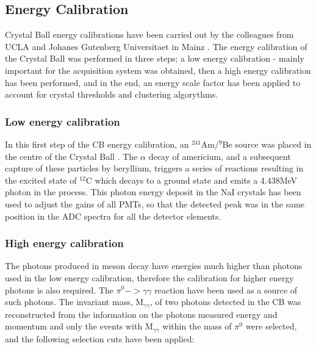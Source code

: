\subsection{Energy Calibration}

\indent Crystal Ball energy calibrations have been carried out by the colleagues from UCLA and Johanes Gutenberg Universitaet in Mainz \cite{marc}. The energy calibration of the Crystal Ball was performed in three steps; a low energy calibration - mainly important for the acquisition system was obtained, then a high energy calibration has been performed, and in the end, an energy scale factor has been applied to account for crystal thresholds and clustering algorythms.

\subsubsection{Low energy calibration}

\indent In this first step of the CB energy calibration, an $^{241}$Am/$^{9}$Be source was placed in the centre of the Crystal Ball \cite{marc}. The $\alpha$ decay of americium, and a subsequent capture of these particles by beryllium, triggers a series of reactions resulting in the excited state of $^{12}$C which decays to a ground state and emits a 4.438MeV photon in the process. This photon energy deposit in the NaI crystals has been used to adjust the gains of all PMTs, so that the detected peak was in the same position in the ADC spectra for all the detector elements.

\subsubsection{High energy calibration}

\indent The photons produced in meson decay have energies much higher than photons used in the low energy calibration, therefore the calibration for higher energy photons is also required. The $\pi^{0}->\gamma\gamma$ reaction have been used as a source of such photons. The invariant mass, M$_{\gamma\gamma}$, of two photons detected in the CB was reconstructed from the information on the photons measured energy and momentum and only the events with M$_{\gamma\gamma}$ within the mass of $\pi^{0}$ were selected, and the following selection cuts have been applied:


